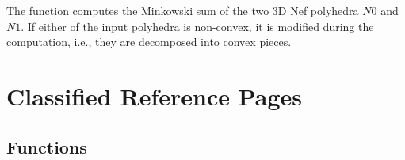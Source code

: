 


The function  computes the Minkowski sum of the
two 3D Nef polyhedra $N0$ and $N1$. If either of the input polyhedra
is non-convex, it is modified during the computation, i.e., they are
decomposed into convex pieces.

\section{Classified Reference Pages}

\subsection*{Functions}

    {
     }

